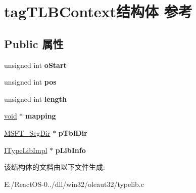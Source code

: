 \hypertarget{structtag_t_l_b_context}{}\section{tag\+T\+L\+B\+Context结构体 参考}
\label{structtag_t_l_b_context}
\subsection*{Public 属性}
\begin{DoxyCompactItemize}
\item 
\mbox{\label{structtag_t_l_b_context_a707e10bedf370b072aca910179ef0eef}} 
unsigned int {\bfseries o\+Start}
\item 
\mbox{\label{structtag_t_l_b_context_a872d936dcb89aceb69d553ca3a7e3945}} 
unsigned int {\bfseries pos}
\item 
\mbox{\label{structtag_t_l_b_context_a76fb8f386000b111805065e60c11c98e}} 
unsigned int {\bfseries length}
\item 
\mbox{\label{structtag_t_l_b_context_a3f39c6be7eeea0817da18bf9822e5526}} 
\hyperlink{interfacevoid}{void} $\ast$ {\bfseries mapping}
\item 
\mbox{\label{structtag_t_l_b_context_a82c1d64001eeab2a760e4fc37f484cf1}} 
\hyperlink{structtag_m_s_f_t___seg_dir}{M\+S\+F\+T\+\_\+\+Seg\+Dir} $\ast$ {\bfseries p\+Tbl\+Dir}
\item 
\mbox{\label{structtag_t_l_b_context_a95cf6a56091359c35e31023c768d7663}} 
\hyperlink{structtag_i_type_lib_impl}{I\+Type\+Lib\+Impl} $\ast$ {\bfseries p\+Lib\+Info}
\end{DoxyCompactItemize}


该结构体的文档由以下文件生成\+:\begin{DoxyCompactItemize}
\item 
E\+:/\+React\+O\+S-\/0../dll/win32/oleaut32/typelib.\+c\end{DoxyCompactItemize}
